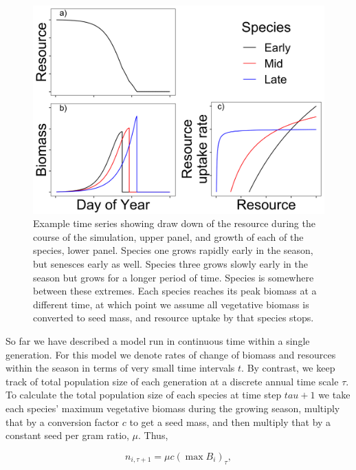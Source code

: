 \documentclass[12pt,]{article}
\begin{document}
\begin{figure}
\centering
\includegraphics{../figures/example_timeseries.png}
\caption{Example time series showing draw down of the resource during
the course of the simulation, upper panel, and growth of each of the
species, lower panel. Species one grows rapidly early in the season, but
senesces early as well. Species three grows slowly early in the season
but grows for a longer period of time. Species is somewhere between
these extremes. Each species reaches its peak biomass at a different
time, at which point we assume all vegetative biomass is converted to
seed mass, and resource uptake by that species stops.}
\end{figure}

So far we have described a model run in continuous time within a single
generation. For this model we denote rates of change of biomass and
resources within the season in terms of very small time intervals \(t\).
By contrast, we keep track of total population size of each generation
at a discrete annual time scale \(\tau\). To calculate the total
population size of each species at time step \(tau+1\) we take each
species' maximum vegetative biomass during the growing season, multiply
that by a conversion factor \(c\) to get a seed mass, and then multiply
that by a constant seed per gram ratio, \(\mu\). Thus,

\vspace{-1em}

\begin{equation} \label{eq6}
n_{i,\tau+1} = \mu c(\max B_i)_{\tau}, 
\end{equation}
\end{document}
